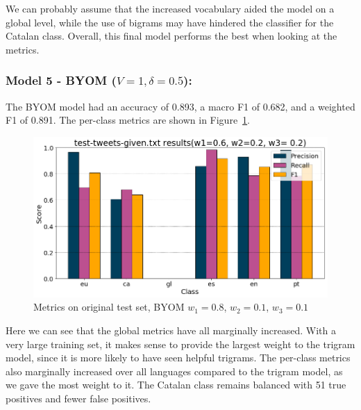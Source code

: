 \documentclass[runningheads]{llncs}
\begin{document}
We can probably assume that the increased vocabulary aided the model on a global level, while the use of bigrams may have hindered the classifier for the Catalan class. Overall, this final model performs the best when looking at the metrics.


\subsubsection{Model 5 - BYOM ($V=1, \delta=0.5$): }
The BYOM model had an accuracy of 0.893, a macro F1 of 0.682, and a weighted F1 of 0.891. The per-class metrics are shown in Figure~\ref{fig:pre_demo_BYOM}. \\

\begin{figure}
    \begin{center}
        \includegraphics[width=12.5cm]{images/test_tweets_given_results_BYOM.png}
        \caption{Metrics on original test set, BYOM $w_1=0.8$, $w_2=0.1$, $w_3=0.1$}
        \label{fig:pre_demo_BYOM}
    \end{center}
\end{figure}

Here we can see that the global metrics have all marginally increased. With a very large training set, it makes sense to provide the largest weight to the trigram model, since it is more likely to have seen helpful trigrams. The per-class metrics also marginally increased over all languages  compared to the trigram model, as we gave the most weight to it. The Catalan class remains balanced with 51 true positives and fewer false positives.
\end{document}
